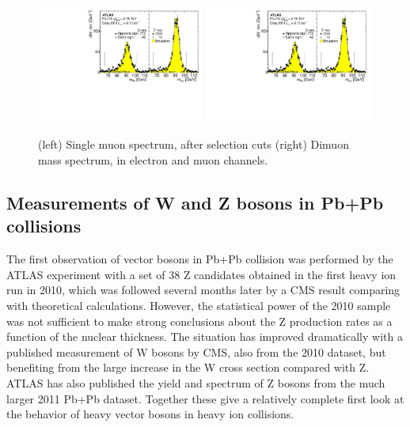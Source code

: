 \begin{figure}[!htb]
\begin{center}
\includegraphics[width=0.49\textwidth]{electroweak_figs/fig_01.pdf}
\includegraphics[width=0.49\textwidth]{electroweak_figs/fig_01.pdf}
\caption[]{(left) Single muon spectrum, after selection cuts (right) Dimuon mass spectrum, in electron and muon channels.}
\label{fig:pas:zw}
\end{center}
\end{figure}

\subsection{Measurements of W and Z bosons in Pb+Pb collisions}

The first observation of vector bosons in Pb+Pb collision was performed by the ATLAS
experiment with a set of 38 Z candidates obtained in the first heavy ion run in 2010, which
was followed several months later by a CMS result comparing with theoretical calculations.
However, the statistical power of the 2010 sample was not sufficient to make strong conclusions
about the Z production rates as a function of the nuclear thickness.
The situation has improved dramatically with a published measurement of W bosons by CMS, also from the
2010 dataset, but benefiting from the large increase in the W cross section compared with Z.
ATLAS has also published the yield and spectrum of Z bosons from the much larger 2011 Pb+Pb dataset.
Together these give a relatively complete first look at the behavior of heavy vector bosons in heavy ion collisions.


